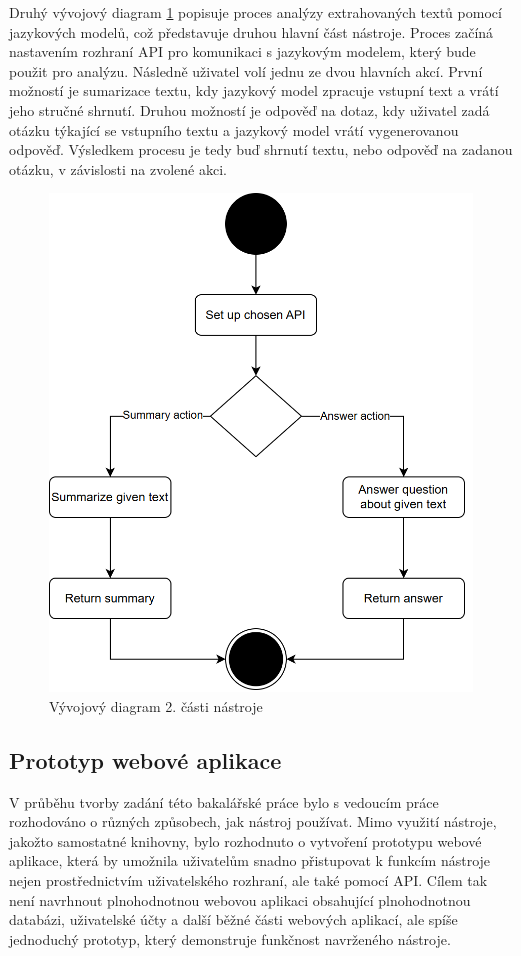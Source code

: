 \clearpage
Druhý vývojový diagram \ref{fig:flowchart2} popisuje proces analýzy extrahovaných textů pomocí jazykových modelů, což představuje druhou hlavní část nástroje.
Proces začíná nastavením rozhraní API pro komunikaci s jazykovým modelem, který bude použit pro analýzu.
Následně uživatel volí jednu ze dvou hlavních akcí.
První možností je sumarizace textu, kdy jazykový model zpracuje vstupní text a vrátí jeho stručné shrnutí.
Druhou možností je odpověď na dotaz, kdy uživatel zadá otázku týkající se vstupního textu a jazykový model vrátí vygenerovanou odpověď.
Výsledkem procesu je tedy buď shrnutí textu, nebo odpověď na zadanou otázku, v závislosti na zvolené akci.


\begin{figure}[!htbp]
    \centering
    \includegraphics[width=0.8\linewidth]{images/flowchart2}
    \caption{Vývojový diagram 2. části nástroje}
    \label{fig:flowchart2}
\end{figure}

\clearpage

\subsection{Prototyp webové aplikace}
V průběhu tvorby zadání této bakalářské práce bylo s vedoucím práce rozhodováno o různých způsobech, jak nástroj používat.
Mimo využití nástroje, jakožto samostatné knihovny, bylo rozhodnuto o vytvoření prototypu webové aplikace, která by umožnila uživatelům snadno přistupovat k funkcím nástroje nejen prostřednictvím uživatelského rozhraní, ale také pomocí API.
Cílem tak není navrhnout plnohodnotnou webovou aplikaci obsahující plnohodnotnou databázi, uživatelské účty a další běžné části webových aplikací, ale spíše jednoduchý prototyp, který demonstruje funkčnost navrženého nástroje.

